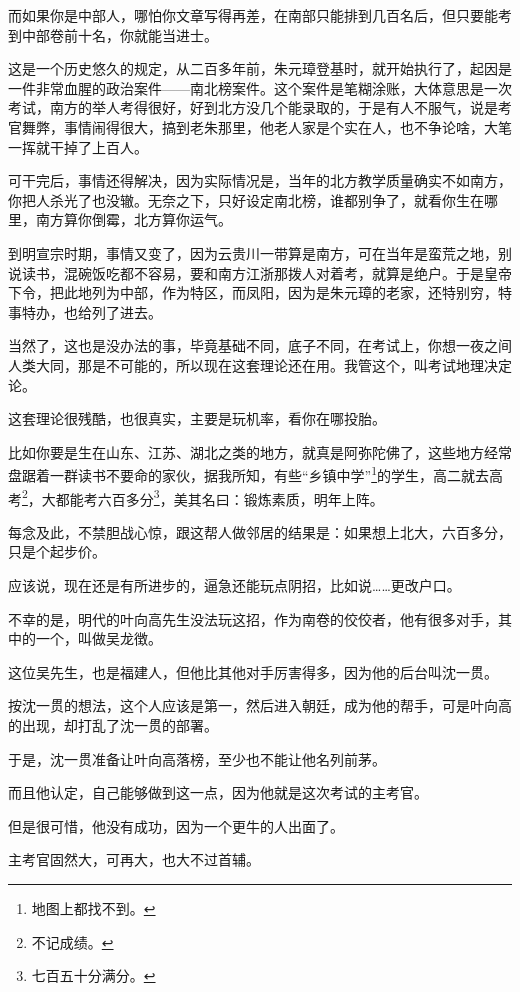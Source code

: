 \begin{multicols}{\theparacolNo}
		而如果你是中部人，哪怕你文章写得再差，在南部只能排到几百名后，但只要能考到中部卷前十名，你就能当进士。

		这是一个历史悠久的规定，从二百多年前，朱元璋登基时，就开始执行了，起因是一件非常血腥的政治案件——南北榜案件。这个案件是笔糊涂账，大体意思是一次考试，南方的举人考得很好，好到北方没几个能录取的，于是有人不服气，说是考官舞弊，事情闹得很大，搞到老朱那里，他老人家是个实在人，也不争论啥，大笔一挥就干掉了上百人。

		可干完后，事情还得解决，因为实际情况是，当年的北方教学质量确实不如南方，你把人杀光了也没辙。无奈之下，只好设定南北榜，谁都别争了，就看你生在哪里，南方算你倒霉，北方算你运气。

		到明宣宗时期，事情又变了，因为云贵川一带算是南方，可在当年是蛮荒之地，别说读书，混碗饭吃都不容易，要和南方江浙那拨人对着考，就算是绝户。于是皇帝下令，把此地列为中部，作为特区，而凤阳，因为是朱元璋的老家，还特别穷，特事特办，也给列了进去。

		当然了，这也是没办法的事，毕竟基础不同，底子不同，在考试上，你想一夜之间人类大同，那是不可能的，所以现在这套理论还在用。我管这个，叫考试地理决定论。

		这套理论很残酷，也很真实，主要是玩机率，看你在哪投胎。

		比如你要是生在山东、江苏、湖北之类的地方，就真是阿弥陀佛了，这些地方经常盘踞着一群读书不要命的家伙，据我所知，有些“乡镇中学”\footnote{地图上都找不到。}的学生，高二就去高考\footnote{不记成绩。}，大都能考六百多分\footnote{七百五十分满分。}，美其名曰：锻炼素质，明年上阵。

		每念及此，不禁胆战心惊，跟这帮人做邻居的结果是：如果想上北大，六百多分，只是个起步价。

		应该说，现在还是有所进步的，逼急还能玩点阴招，比如说……更改户口。

		不幸的是，明代的叶向高先生没法玩这招，作为南卷的佼佼者，他有很多对手，其中的一个，叫做吴龙徴。

		这位吴先生，也是福建人，但他比其他对手厉害得多，因为他的后台叫沈一贯。

		按沈一贯的想法，这个人应该是第一，然后进入朝廷，成为他的帮手，可是叶向高的出现，却打乱了沈一贯的部署。

		于是，沈一贯准备让叶向高落榜，至少也不能让他名列前茅。

		而且他认定，自己能够做到这一点，因为他就是这次考试的主考官。

		但是很可惜，他没有成功，因为一个更牛的人出面了。

		主考官固然大，可再大，也大不过首辅。


\end{multicols}
